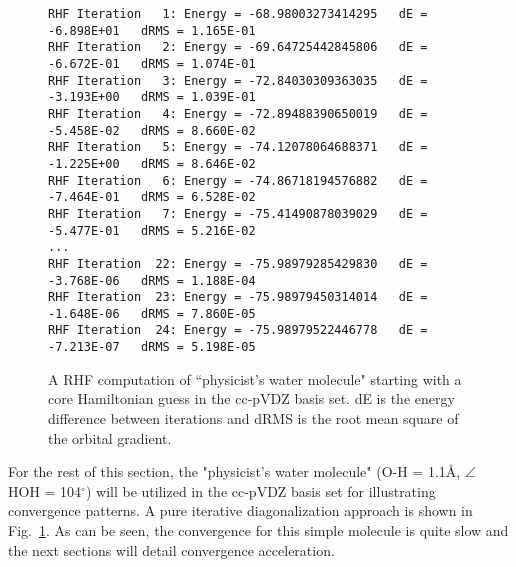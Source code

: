 \documentclass[aip,jcp,preprint,superscriptaddress,floatfix]{revtex4-1}
\begin{document}
\begin{figure}[htbp]
\begin{center}
\caption{A RHF computation of ``physicist's water molecule" starting with a core Hamiltonian guess in the cc-pVDZ basis set. dE is the energy difference between iterations and dRMS is the root mean square of the orbital gradient.}
\label{rhf_water}
{\footnotesize\linespread{1}\normalfont\ttfamily
\begin{verbatim}
RHF Iteration   1: Energy = -68.98003273414295   dE = -6.898E+01   dRMS = 1.165E-01
RHF Iteration   2: Energy = -69.64725442845806   dE = -6.672E-01   dRMS = 1.074E-01
RHF Iteration   3: Energy = -72.84030309363035   dE = -3.193E+00   dRMS = 1.039E-01
RHF Iteration   4: Energy = -72.89488390650019   dE = -5.458E-02   dRMS = 8.660E-02
RHF Iteration   5: Energy = -74.12078064688371   dE = -1.225E+00   dRMS = 8.646E-02
RHF Iteration   6: Energy = -74.86718194576882   dE = -7.464E-01   dRMS = 6.528E-02
RHF Iteration   7: Energy = -75.41490878039029   dE = -5.477E-01   dRMS = 5.216E-02
...
RHF Iteration  22: Energy = -75.98979285429830   dE = -3.768E-06   dRMS = 1.188E-04
RHF Iteration  23: Energy = -75.98979450314014   dE = -1.648E-06   dRMS = 7.860E-05
RHF Iteration  24: Energy = -75.98979522446778   dE = -7.213E-07   dRMS = 5.198E-05
\end{verbatim}
}
\end{center}
\end{figure}

For the rest of this section, the "physicist's water molecule" (O-H = 1.1\AA, $\angle$ HOH = 104$^{\circ}$) will be utilized in the cc-pVDZ basis set for illustrating convergence patterns.
A pure iterative diagonalization approach is shown in Fig.~\ref{rhf_water}.
As can be seen, the convergence for this simple molecule is quite slow and the next sections will detail convergence acceleration.

\newpage



\end{document}

